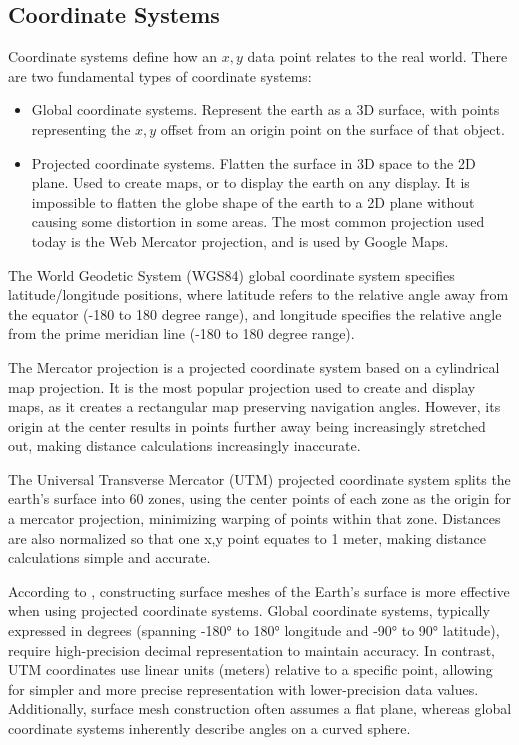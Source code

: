\documentclass[12pt]{article}
\begin{document}
\subsection{Coordinate Systems}

Coordinate systems define how an $x,y$ data point relates to the real world. There are two fundamental types of coordinate systems:

\begin{itemize}
  \item Global coordinate systems. Represent the earth as a 3D surface, with points representing the $x,y$ offset from an origin point on the surface of that object.
  \item Projected coordinate systems. Flatten the surface in 3D space to the 2D plane. Used to create maps, or to display the earth on any display. It is impossible to flatten the globe shape of the earth to a 2D plane without causing some distortion in some areas. The most common projection used today is the Web Mercator projection, and is used by Google Maps.
\end{itemize}

The World Geodetic System (WGS84) global coordinate system specifies latitude/longitude positions, where latitude refers to the relative angle away from the equator (-180 to 180 degree range), and longitude specifies the relative angle from the prime meridian line (-180 to 180 degree range).

The Mercator projection is a projected coordinate system based on a cylindrical map projection. It is the most popular projection used to create and display maps, as it creates a rectangular map preserving navigation angles. However, its origin at the center results in points further away being increasingly stretched out, making distance calculations increasingly inaccurate.

The Universal Transverse Mercator (UTM) projected coordinate system splits the earth's surface into 60 zones, using the center points of each zone as the origin for a mercator projection, minimizing warping of points within that zone. Distances are also normalized so that one x,y point equates to 1 meter, making distance calculations simple and accurate.

According to \textcite{cgal:eb-24b}, constructing surface meshes of the Earth's surface is more effective when using projected coordinate systems. Global coordinate systems, typically expressed in degrees (spanning -180° to 180° longitude and -90° to 90° latitude), require high-precision decimal representation to maintain accuracy. In contrast, UTM coordinates use linear units (meters) relative to a specific point, allowing for simpler and more precise representation with lower-precision data values. Additionally, surface mesh construction often assumes a flat plane, whereas global coordinate systems inherently describe angles on a curved sphere.
\end{document}
